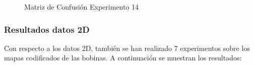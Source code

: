 \begin{itemize}
\begin{figure}[h]
     \caption{Matriz de Confusión Experimento 14}
     \label{f:exp14}
    \end{figure}    
\end{itemize}

\subsubsection{Resultados datos 2D}
Con respecto a los datos 2D, también se han realizado 7 experimentos sobre los mapas codificados de las bobinas. A continuación se muestran los resultados:

